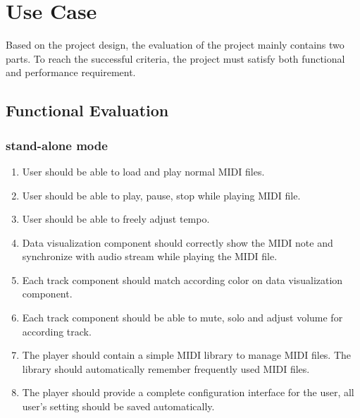 
\chapter{Use Case} %



\ifpdf
    \graphicspath{{X/figures/PNG/}{X/figures/PDF/}{X/figures/}}
\else
    \graphicspath{{X/figures/EPS/}{X/figures/}}
\fi



Based on the project design, the evaluation of the project mainly contains two parts. To reach the
successful criteria, the project must satisfy both functional and performance requirement.

\section{Functional Evaluation}
\subsection{stand-alone mode}
\begin{enumerate}
  \item User should be able to load and play normal MIDI files.
  \item User should be able to play, pause, stop while playing MIDI file.  
  \item User should be able to freely adjust tempo.  
  \item Data visualization component should correctly show the MIDI note 
        and synchronize with audio stream while playing the MIDI file.
  \item Each track component should match according color on data visualization component.
  \item Each track component should be able to mute, solo and adjust 
        volume for according track.  
  \item The player should contain a simple MIDI library to manage MIDI files. 
        The library should automatically remember frequently used MIDI files.
  \item The player should provide a complete configuration interface for the 
        user, all user's setting should be saved automatically.
\end{enumerate}

